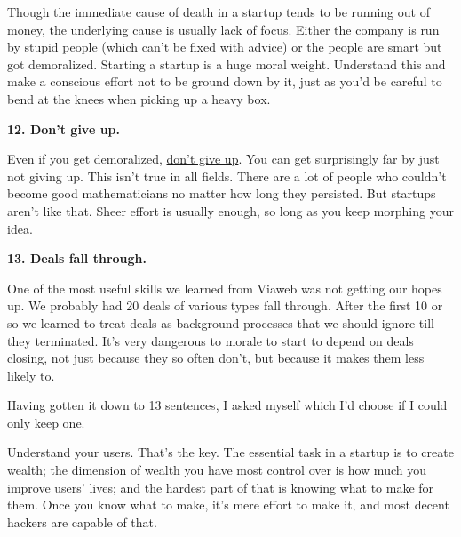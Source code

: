 Though the immediate cause of death in a
                    startup tends to be running out of money, the underlying
                    cause is usually lack of focus. Either the company is run by
                    stupid people (which can't be fixed with advice) or the
                    people are smart but got demoralized. Starting a startup is
                    a huge moral weight. Understand this and make a conscious
                    effort not to be ground down by it, just as you'd be careful
                    to bend at the knees when picking up a heavy box.

\textbf{12. Don't give up.}

Even if you get demoralized,
                    \href{http://www.paulgraham.com/die.html}{don't give up}. You can get
                    surprisingly far by just not giving up. This isn't true in
                    all fields. There are a lot of people who couldn't become
                    good mathematicians no matter how long they persisted. But
                    startups aren't like that. Sheer effort is usually enough,
                    so long as you keep morphing your idea.

\textbf{13. Deals fall through.}

One of the most useful skills we learned from
                    Viaweb was not getting our hopes up. We probably had 20
                    deals of various types fall through. After the first 10 or
                    so we learned to treat deals as background processes that we
                    should ignore till they terminated. It's very dangerous to
                    morale to start to depend on deals closing, not just because
                    they so often don't, but because it makes them less likely
                    to.
                  


                  
                    Having gotten it down to 13 sentences, I asked myself which
                    I'd choose if I could only keep one.

Understand
                    your users. That's the key. The essential task in a startup
                    is to create wealth; the dimension of wealth you have most
                    control over is how much you improve users' lives; and the
                    hardest part of that is knowing what to make for them. Once
                    you know what to make, it's mere effort to make it, and most
                    decent hackers are capable of that.


